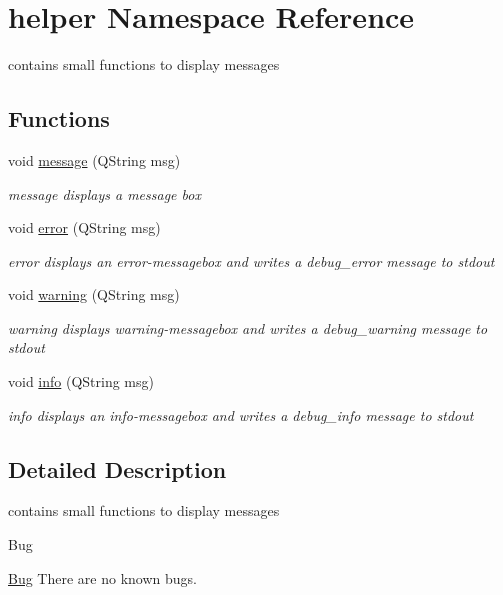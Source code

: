\hypertarget{namespacehelper}{}\section{helper Namespace Reference}
\label{namespacehelper}


contains small functions to display messages  


\subsection*{Functions}
\begin{DoxyCompactItemize}
\item 
void \hyperlink{namespacehelper_ab2cc8239d9bf2ae383474c0343205346}{message} (Q\+String msg)
\begin{DoxyCompactList}\small\item\em message displays a message box \end{DoxyCompactList}\item 
void \hyperlink{namespacehelper_a00e308809a0f9d76f3a0ba2ad5f3587c}{error} (Q\+String msg)
\begin{DoxyCompactList}\small\item\em error displays an error-\/messagebox and writes a debug\+\_\+error message to stdout \end{DoxyCompactList}\item 
void \hyperlink{namespacehelper_ac717f710dcb45bf31fba9071ea4fb45f}{warning} (Q\+String msg)
\begin{DoxyCompactList}\small\item\em warning displays warning-\/messagebox and writes a debug\+\_\+warning message to stdout \end{DoxyCompactList}\item 
void \hyperlink{namespacehelper_a88e86d2fd14fc8354c1529beaa157f25}{info} (Q\+String msg)
\begin{DoxyCompactList}\small\item\em info displays an info-\/messagebox and writes a debug\+\_\+info message to stdout \end{DoxyCompactList}\end{DoxyCompactItemize}


\subsection{Detailed Description}
contains small functions to display messages 

\begin{DoxyRefDesc}{Bug}
\item[\hyperlink{bug__bug000003}{Bug}]There are no known bugs. \end{DoxyRefDesc}


